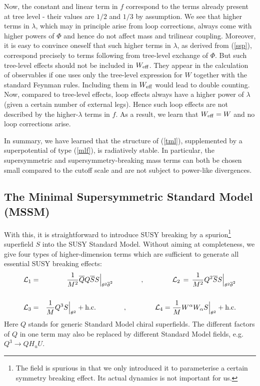 \documentclass[12pt]{article}
\newcommand{\bea}{\begin{eqnarray}}
\newcommand{\eea}{\end{eqnarray}}
\newcommand{\ol}{\overline}
\numberwithin{equation}{section}
\begin{document}
Now, the constant and linear term in $f$ correspond to the terms already present at tree level - their values are $1/2$ and $1/3$ by assumption. We see that higher terms in $\lambda$, which may in principle arise from loop corrections, always come with higher powers of $\Phi$ and hence do not affect mass and trilinear coupling. Moreover, it is easy to convince oneself that such higher terms in $\lambda$, as derived from (\ref{ssp}), correspond precisely to terms following from tree-level exchange of $\Phi$. But such tree-level effects should not be included in $W_{\rm eff}$. They appear in the calculation of observables if one uses only the tree-level expression for $W$ together with the standard Feynman rules. Including them in $W_{\rm eff}$ would lead to double counting. Now, compared to tree-level effects, loop effects always have a higher power of $\lambda$ (given a certain number of external legs). Hence such loop effects are not described by the higher-$\lambda$ terms in $f$. As a result, we learn that $W_{\rm eff}=W$ and no loop corrections arise. 

In summary, we have learned that the structure of (\ref{tml}), supplemented by a superpotential of type (\ref{mlf}), is radiatively stable. In particular, the supersymmetric and supersymmetry-breaking mass terms can both be chosen small compared to the cutoff scale and are not subject to power-like divergences. 






\subsection{The Minimal Supersymmetric Standard Model (MSSM)}

With this, it is straightforward to introduce SUSY breaking by a spurion\footnote{
The field is spurious in that we only introduced it to parameterise a certain symmetry breaking effect. Its actual dynamics is not important for us.
}
 superfield $S$ into the SUSY Standard Model. Without aiming at completeness, we give four types of higher-dimension terms which are sufficient to generate all essential SUSY breaking effects:
\bea
{\cal L}_1 &=& \frac{1}{M^2}\ol{Q}Q\ol{S}S\Big|_{\theta^2\ol{\theta}^2}\qquad 
\qquad,\qquad\qquad {\cal L}_2 \,=\, \frac{1}{M^2}Q^2\ol{S}S\Big|_{\theta^2\ol{\theta}^2}
\nonumber \\
\\
{\cal L}_3 &=& \frac{1}{M} Q^3 S\Big|_{\theta^2}+\mbox{h.c.}\qquad\qquad,\qquad \qquad {\cal L}_4 = \frac{1}{M} W^\alpha W_\alpha S\Big|_{\theta^2}+\mbox{h.c.}
\nonumber
\eea
Here $Q$ stands for generic Standard Model chiral superfields. The different factors of $Q$ in one term may also be replaced by different Standard Model fields, e.g. $Q^3\to QH_uU$. 
\end{document}
